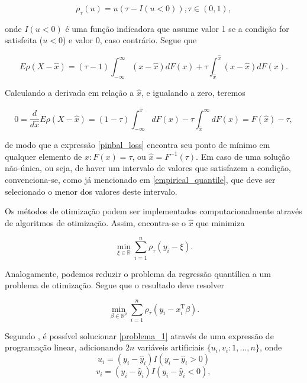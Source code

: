 \begin{equation}
\rho_\tau(u) = u(\tau - I(u < 0)), \tau \in (0, 1),
\label{pinbal_loss}
\end{equation}

\noindent onde $I(u < 0)$ é uma função indicadora que assume valor 1 se a condição for satisfeita ($u < 0$) e valor 0, caso contrário. Segue que

\begin{equation}
    E\rho(X - \hat{x}) = (\tau - 1) \displaystyle \int_{-\infty}^{\infty} (x - \hat{x}) dF(x) + \tau \displaystyle \int_{\hat{x}}^{\hat{x}} (x-\hat{x}) dF(x).
\end{equation}

Calculando a derivada em relação a $\hat{x}$, e igualando a zero, teremos

\begin{equation}
    0 = \frac{d}{d\hat{x}} E\rho(X - \hat{x}) = (1 - \tau) \displaystyle\int_{-\infty}^{\hat{x}} dF(x) -\tau\displaystyle\int_{\hat{x}}^{\infty} dF(x) = F(\hat{x}) - \tau,
\end{equation}

\noindent de modo que a expressão \ref{pinbal_loss} encontra seu ponto de mínimo em qualquer elemento de ${x: F(x) = \tau}$, ou $\hat{x} = F^{-1}(\tau)$. Em caso de uma solução não-única, ou seja, de haver um intervalo de valores que satisfazem a condição, convenciona-se, como já mencionado em \ref{empirical_quantile}, que deve ser selecionado o menor dos valores deste intervalo.

Os métodos de otimização podem ser implementados computacionalmente através de algoritmos de otimização. Assim, encontra-se o $\hat{x}$ que minimiza

\begin{equation}
\displaystyle \min_{\xi \in \mathbb{R}} \displaystyle \sum_{i=1}^{n} \rho_\tau(y_i - \xi).
\label{problema_1}
\end{equation}

Analogamente, podemos reduzir o problema da regressão quantílica a um problema de otimização. Segue que o resultado deve resolver

\begin{equation}
\displaystyle \min_{\beta \in \mathbb{R}^{p}} \displaystyle \sum_{i=1}^{n} \rho_\tau(y_i - x_i^{\text{T}}\beta).
\label{problema_2}
\end{equation}

Segundo , é possível solucionar \ref{problema_1} através de uma expressão de programação linear, adicionando $2n$ variáveis artificiais $\{u_i, v_i: 1, \dots, n\}$, onde
\begin{equation}
    u_i = (y_i - \hat{y}_i) I(y_i - \hat{y}_i > 0)
\end{equation}
\begin{equation}
    v_i = (y_i - \hat{y}_i) I(y_i - \hat{y}_i < 0),
\end{equation}

